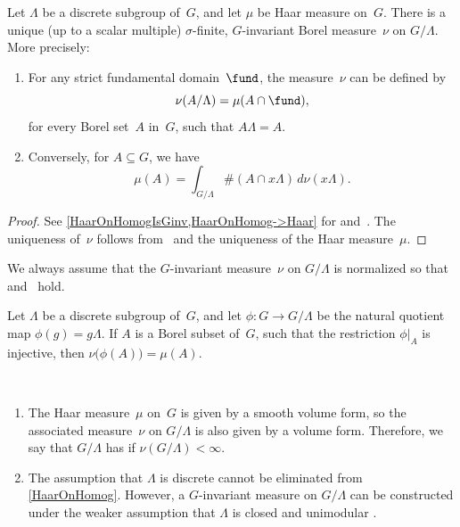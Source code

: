 \begin{prop} \label{HaarOnHomog}
 Let $\Lambda$ be a discrete subgroup of~$G$, and let
$\mu$ be Haar measure on~$G$. There is a unique
\textup(up to a scalar multiple\textup)
$\sigma$-finite, $G$-invariant Borel measure~$\nu$ on
$G/\Lambda$.
More precisely:
 \begin{enumerate}
 \item \label{HaarOnHomog-nu}
 For any strict fundamental domain~$\fund$, the
measure~$\nu$ can be defined by 
  \begin{equation} \label{HomogFromHaar}
 \nu(A/\Lambda) = \mu( A \cap \fund) ,
 \end{equation}
 for every Borel set~$A$ in~$G$, such that $A \Lambda = A$.
 \item \label{HaarOnHomog-mu}
 Conversely, for $A \subseteq G$, we have
 \begin{equation} \label{HaarFromHomog}
 \mu(A) = \int_{G/\Lambda} \#(A \cap x \Lambda)
\, d \nu(x \Lambda) .
 \end{equation}
 \end{enumerate}
 \end{prop}

\begin{proof} 
 See \cref{HaarOnHomogIsGinv,HaarOnHomog->Haar} for 
and~. The uniqueness of~$\nu$ follows
from~ and the uniqueness of the Haar
measure~$\mu$.
 \end{proof}

\begin{rem}
 We always assume that the $G$-invariant measure~$\nu$ on
$G/\Lambda$ is normalized so that
 and~ hold.
 \end{rem}

\begin{cor} \label{inject->samemeas}
 Let $\Lambda$ be a discrete subgroup of~$G$, and let
$\phi \colon G \to G/\Lambda$ be the natural
quotient map $\phi(g) = g \Lambda$. If $A$ is a Borel
subset of~$G$, such that the restriction $\phi|_A$ is
injective, then $\nu \bigl( \phi(A) \bigr) = \mu(A)$.
 \end{cor}

\begin{rems} \ \label{VolOnG/Gamma}
 \noprelistbreak
 \begin{enumerate}
 \item \label{VolOnG/Gamma-smooth}
 The Haar measure~$\mu$ on~$G$ is given by a smooth
volume form, so the associated measure~$\nu$ on $G/\Lambda$ is also given by a volume form. Therefore, we say
that $G/\Lambda$ has  if $\nu(G/\Lambda) < \infty$.
 \item The assumption that $\Lambda$ is discrete cannot be
eliminated from \cref{HaarOnHomog}. However, a $G$-invariant measure on $G/\Lambda$ can be constructed under the weaker assumption that $\Lambda$ is closed and
unimodular . 
 \end{enumerate}
 \end{rems}

